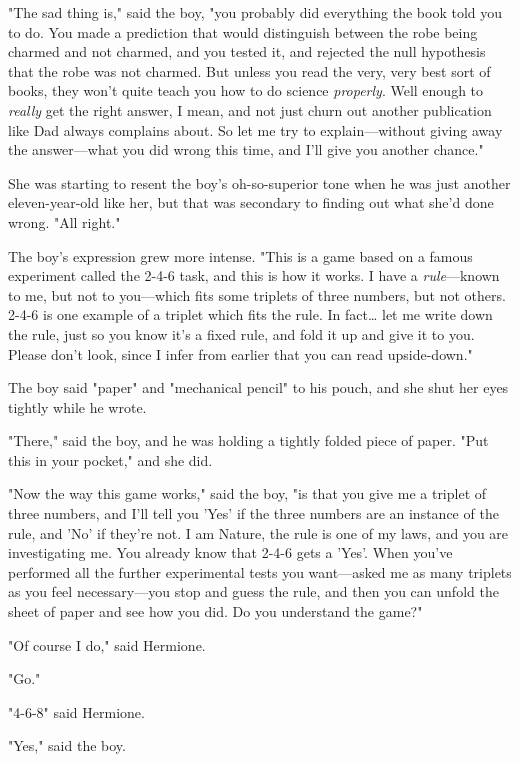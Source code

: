 "The sad thing is," said the boy, "you probably did everything the book told 
you to do. You made a prediction that would distinguish between the robe being 
charmed and not charmed, and you tested it, and rejected the null hypothesis 
that the robe was not charmed. But unless you read the very, very best sort of 
books, they won't quite teach you how to do science \emph{properly}. Well 
enough to \emph{really} get the right answer, I mean, and not just churn out 
another publication like Dad always complains about. So let me try to 
explain---without giving away the answer---what you did wrong this time, and 
I'll give you another chance."

She was starting to resent the boy's oh-so-superior tone when he was just 
another eleven-year-old like her, but that was secondary to finding out what 
she'd done wrong. "All right."

The boy's expression grew more intense. "This is a game based on a famous 
experiment called the 2-4-6 task, and this is how it works. I have a 
\emph{rule}---known to me, but not to you---which fits some triplets of three 
numbers, but not others. 2-4-6 is one example of a triplet which fits the rule. 
In fact{\ldots} let me write down the rule, just so you know it's a fixed rule, 
and fold it up and give it to you. Please don't look, since I infer from 
earlier that you can read upside-down."

The boy said "paper" and "mechanical pencil" to his pouch, and she shut her 
eyes tightly while he wrote.

"There," said the boy, and he was holding a tightly folded piece of paper. "Put 
this in your pocket," and she did.

"Now the way this game works," said the boy, "is that you give me a triplet of 
three numbers, and I'll tell you 'Yes' if the three numbers are an instance of 
the rule, and 'No' if they're not. I am Nature, the rule is one of my laws, and 
you are investigating me. You already know that 2-4-6 gets a 'Yes'. When you've 
performed all the further experimental tests you want---asked me as many 
triplets as you feel necessary---you stop and guess the rule, and then you can 
unfold the sheet of paper and see how you did. Do you understand the game?"

"Of course I do," said Hermione.

"Go."

"4-6-8" said Hermione.

"Yes," said the boy.

